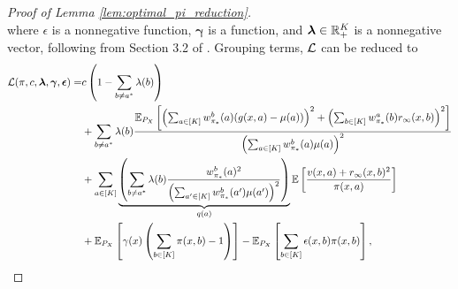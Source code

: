 \documentclass{article}
\begin{document}
\begin{appendices}
\begin{proof}[Proof of Lemma \ref{lem:optimal_pi_reduction}]
\begin{equation}
    \end{equation}
    where $\epsilon$ is a nonnegative function, $\bm{\gamma}$ is a function, and $\boldsymbol{\lambda} \in \mathbb{R}_+^K$ is a nonnegative vector, following from Section 3.2 of \cite{shapiro2014lectures}. Grouping terms, $\mathcal{L}$ can be reduced to
    \begin{align}
        \mathcal{L}(\pi, c, \boldsymbol{\lambda}, \boldsymbol{\gamma}, \boldsymbol{\epsilon}) =& c\left( 1 - \sum_{b \neq a^*} \lambda(b) \right) \\
        &+\sum_{b \neq a^*} \lambda(b)\frac{\mathbb{E}_{P_X}\left[\left(\sum_{a \in [K]} w_{\pi_*}^b(a)(g(x,a) - \mu(a)) \right)^2 + \left(\sum_{b \in [K]} w_{\pi_*}^a(b) r_\infty(x,b)  \right)^2\right]}{\left(\sum_{a \in [K]} w_{\pi_*}^b(a)\mu(a)\right)^2} \\
        &+ \sum_{a \in [K]}\underbrace{\left(\sum_{b \neq a^*}\lambda(b) \frac{w_{\pi_*}^b(a)^2}{\left(\sum_{a' \in [K]} w_{\pi_*}^b(a')\mu(a') \right)^2}\right)}_{q(a)} \mathbb{E}\left[ \frac{v(x,a) + r_\infty(x,b)^2}{\pi(x,a)}\right] \label{l:dual_plug_in} \\
        &+\mathbb{E}_{P_X}\left[\gamma(x) \left( \sum_{b \in [K]}\pi(x,b) - 1\right) \right] - \mathbb{E}_{P_X}\left[ \sum_{b \in [K]}\epsilon(x,b) \pi(x,b)  \right],
    \end{align}


\end{proof}
\end{appendices}
\end{document}
